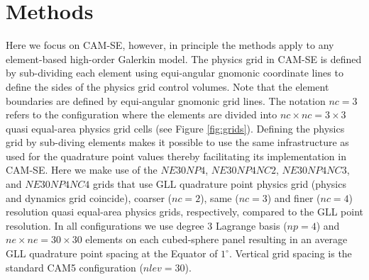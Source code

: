 \documentclass[twocol]{ametsoc}
\begin{document}

{\color{red}{It is the purpose of this paper to formulate the CAM-SE-physgrid version in which we separate physics and dynamics grids as illustrated in one dimension above. We show simulations from Held-Suarez .... CAM5 aquaplanet. ...}}



\section{Methods}
Here we focus on CAM-SE, however, in principle the methods apply to any element-based high-order Galerkin model. The physics grid in CAM-SE is defined by sub-dividing each element using equi-angular gnomonic coordinate lines to define the sides of the physics grid control volumes. Note that the element boundaries are defined by equi-angular gnomonic grid lines.  The notation $nc=3$ refers to the configuration where the elements are divided into $nc\times nc=3\times 3$ quasi equal-area physics grid cells (see Figure \ref{fig:grids}). Defining the physics grid by sub-diving elements makes it possible to use the same infrastructure as used for the quadrature point values thereby facilitating its implementation in CAM-SE. Here we make use of the $NE30NP4$, $NE30NP4NC2$, $NE30NP4NC3$, and $NE30NP4NC4$ grids that use GLL quadrature point physics grid (physics and dynamics grid coincide), coarser ($nc=2$), same ($nc=3$) and finer ($nc=4$) resolution quasi equal-area physics grids, respectively, compared to the GLL point resolution. In all configurations we use degree 3 Lagrange basis ($np=4$) and $ne\times ne=30\times 30$ elements on each cubed-sphere panel resulting in an average GLL quadrature point spacing at the Equator of $1^\circ$. Vertical grid spacing is the standard CAM5 configuration ($nlev=30$).
\end{document}
